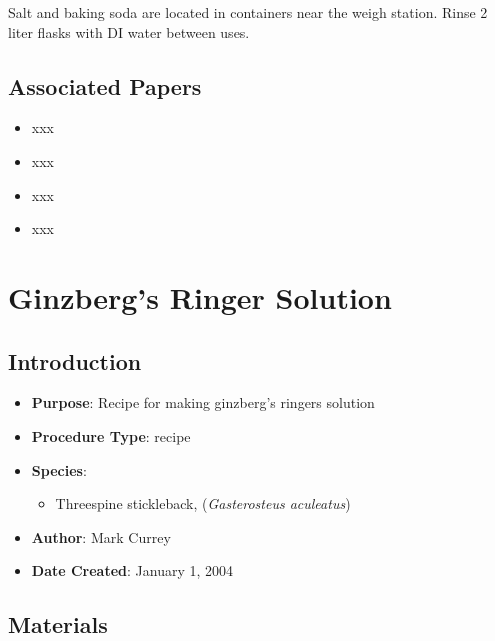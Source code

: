 \documentclass[
  letterpaper,
  DIV=11,
  numbers=noendperiod]{scrreprt}
\providecommand{\tightlist}{%
  \setlength{\itemsep}{0pt}\setlength{\parskip}{0pt}}\usepackage{longtable,booktabs,array}
\begin{document}
Salt and baking soda are located in containers near the weigh station.
Rinse 2 liter flasks with DI water between uses.

\hypertarget{associated-papers-42}{%
\section{Associated Papers}\label{associated-papers-42}}

\begin{itemize}
\tightlist
\item
  xxx
\item
  xxx
\item
  xxx
\item
  xxx
\end{itemize}

\hypertarget{sec-general_recipe_ginzbergs_ringers}{%
\chapter{Ginzberg's Ringer
Solution}\label{sec-general_recipe_ginzbergs_ringers}}

\hypertarget{introduction-67}{%
\section{Introduction}\label{introduction-67}}

\begin{itemize}
\tightlist
\item
  \textbf{Purpose}: Recipe for making ginzberg's ringers solution\\
\item
  \textbf{Procedure Type}: recipe
\item
  \textbf{Species}:

  \begin{itemize}
  \tightlist
  \item
    Threespine stickleback, (\emph{Gasterosteus aculeatus})
  \end{itemize}
\item
  \textbf{Author}: Mark Currey
\item
  \textbf{Date Created}: January 1, 2004
\end{itemize}

\hypertarget{materials-62}{%
\section{Materials}\label{materials-62}}
\end{document}
